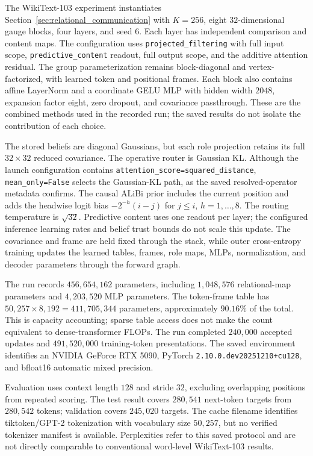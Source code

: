 \documentclass[twoside,11pt]{article}
\begin{document}
The WikiText-103 experiment instantiates Section~\ref{sec:relational_communication} with $K=256$, eight $32$-dimensional gauge blocks, four layers, and seed 6. Each layer has independent comparison and content maps. The configuration uses \texttt{projected\_\allowbreak filtering} with full input scope, \texttt{predictive\_\allowbreak content} readout, full output scope, and the additive attention residual. The group parameterization remains block-diagonal and vertex-factorized, with learned token and positional frames. Each block also contains affine LayerNorm and a coordinate GELU MLP with hidden width $2048$, expansion factor eight, zero dropout, and covariance passthrough. These are the combined methods used in the recorded run; the saved results do not isolate the contribution of each choice.

The stored beliefs are diagonal Gaussians, but each role projection retains its full $32\times32$ reduced covariance. The operative router is Gaussian KL. Although the launch configuration contains \texttt{attention\_\allowbreak score=squared\_\allowbreak distance}, \texttt{mean\_\allowbreak only=False} selects the Gaussian-KL path, as the saved resolved-operator metadata confirms. The causal ALiBi prior includes the current position and adds the headwise logit bias $-2^{-h}(i-j)$ for $j\le i$, $h=1,\ldots,8$. The routing temperature is $\sqrt{32}$. Predictive content uses one readout per layer; the configured inference learning rates and belief trust bounds do not scale this update. The covariance and frame are held fixed through the stack, while outer cross-entropy training updates the learned tables, frames, role maps, MLPs, normalization, and decoder parameters through the forward graph.

The run records $456{,}654{,}162$ parameters, including $1{,}048{,}576$ relational-map parameters and $4{,}203{,}520$ MLP parameters. The token-frame table has $50{,}257\times8{,}192=411{,}705{,}344$ parameters, approximately $90.16\%$ of the total. This is capacity accounting; sparse table access does not make the count equivalent to dense-transformer FLOPs. The run completed $240{,}000$ accepted updates and $491{,}520{,}000$ training-token presentations. The saved environment identifies an NVIDIA GeForce RTX 5090, PyTorch \texttt{2.10.0.dev20251210+cu128}, and bfloat16 automatic mixed precision.

Evaluation uses context length $128$ and stride $32$, excluding overlapping positions from repeated scoring. The test result covers $280{,}541$ next-token targets from $280{,}542$ tokens; validation covers $245{,}020$ targets. The cache filename identifies tiktoken/GPT-2 tokenization with vocabulary size $50{,}257$, but no verified tokenizer manifest is available. Perplexities refer to this saved protocol and are not directly comparable to conventional word-level WikiText-103 results.
\end{document}

